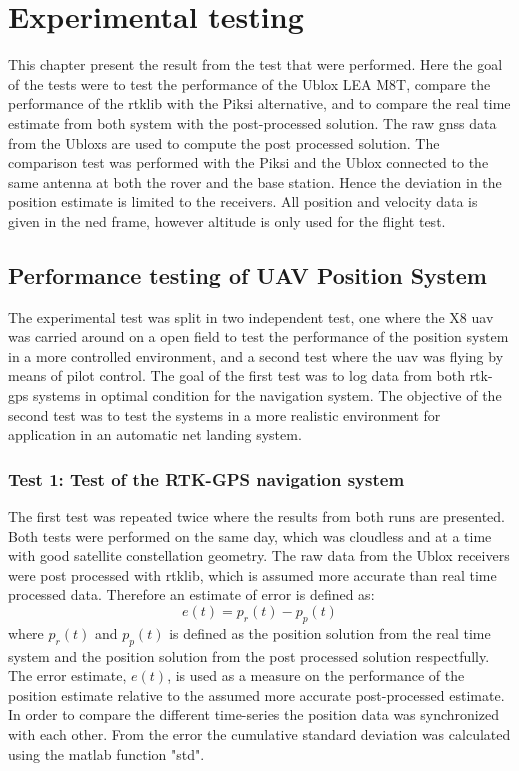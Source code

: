 
\chapter{Experimental testing}
This chapter present the result from the test that were performed. Here the goal of the tests were to test the performance of the Ublox LEA M8T, compare the performance of the \acrfull{rtklib} with the Piksi alternative, and to compare the real time estimate from both system with the post-processed solution. The raw \gls{gnss} data from the Ubloxs are used to compute the post processed solution. The comparison test was performed with the Piksi and the Ublox connected to the same antenna at both the rover and the base station. Hence the deviation in the position estimate is limited to the receivers. All position and velocity data is given in the \gls{ned} frame, however altitude is only used for the flight test.
\section{Performance testing of UAV Position System}
The experimental test was split in two independent test, one where the X8 \gls{uav} was carried around on a open field to test the performance of the position system in a more controlled environment, and a second test where the \gls{uav} was flying by means of pilot control. The goal of the first test was to log data from both \gls{rtk-gps} systems in optimal condition for the navigation system. The objective of the second test was to test the systems in a more realistic environment for application in an automatic net landing system. 


\subsection{Test 1: Test of the RTK-GPS navigation system}
The first test was repeated twice where the results from both runs are presented. Both tests were performed on the same day, which was cloudless and at a time with good satellite constellation geometry. The raw data from the Ublox receivers were post processed with \gls{rtklib}, which is assumed more accurate than real time processed data. Therefore an estimate of error is defined as:
\begin{equation}
e(t) = p_r(t) - p_p(t)
\end{equation}
where $p_r(t)$ and $p_p(t)$ is defined as the position solution from the real time system and the position solution from the post processed solution respectfully. The error estimate, $e(t)$, is used as a measure on the performance of the position estimate relative to the assumed more accurate post-processed estimate. In order to compare the different time-series the position data was synchronized with each other. From the error the cumulative standard deviation was calculated using the matlab function "std".
